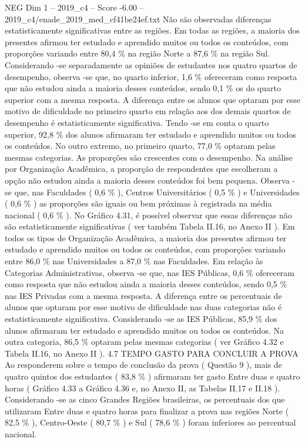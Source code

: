 \begin{textsample}{NEG Dim 1 – 2019\_c4 – Score -6.00 – 2019\_c4/enade\_2019\_med\_cf41be24ef.txt}
Não são observadas diferenças estatisticamente significativas entre as regiões.
Em todas as regiões, a maioria dos presentes afirmou ter estudado e aprendido muitos ou todos os conteúdos, com proporções variando entre 80,4 \% na região Norte a 87,6 \% na região Sul.
Considerando -se separadamente as opiniões de estudantes nos quatro quartos de desempenho, observa -se que, no quarto inferior, 1,6 \% ofereceram como resposta que não estudou ainda a maioria desses conteúdos, sendo 0,1 \% os do quarto superior com a mesma resposta.
A diferença entre os alunos que optaram por esse motivo de dificuldade no primeiro quarto em relação aos dos demais quartos de desempenho é estatisticamente significativa.
Tendo -se em conta o quarto superior, 92,8 \% dos alunos afirmaram ter estudado e aprendido muitos ou todos os conteúdos.
No outro extremo, no primeiro quarto, 77,0 \% optaram pelas mesmas categorias.
As proporções são crescentes com o desempenho.
Na análise por Organização Acadêmica, a proporção de respondentes que escolheram a opção não estudou ainda a maioria desses conteúdos foi bem pequena.
Observa -se que, nas Faculdades ( 0,6 \% ), Centros Universitários ( 0,5 \% ) e Universidades ( 0,6 \% ) as proporções são iguais ou bem próximas à registrada na média nacional ( 0,6 \% ).
No Gráfico 4.31, é possível observar que essas diferenças não são estatisticamente significativas ( ver também Tabela II.16, no Anexo II ).
Em todos os tipos de Organização Acadêmica, a maioria dos presentes afirmou ter estudado e aprendido muitos ou todos os conteúdos, com proporções variando entre 86,0 \% nas Universidades a 87,0 \% nas Faculdades.
Em relação às Categorias Administrativas, observa -se que, nas IES Públicas, 0,6 \% ofereceram como resposta que não estudou ainda a maioria desses conteúdos, sendo 0,5 \% nas IES Privadas com a mesma resposta.
A diferença entre os percentuais de alunos que optaram por esse motivo de dificuldade nas duas categorias não é estatisticamente significativa.
Considerando -se as IES Públicas, 85,9 \% dos alunos afirmaram ter estudado e aprendido muitos ou todos os conteúdos.
Na outra categoria, 86,5 \% optaram pelas mesmas categorias ( ver Gráfico 4.32 e Tabela II.16, no Anexo II ). 4.7 TEMPO GASTO PARA CONCLUIR A PROVA Ao responderem sobre o tempo de conclusão da prova ( Questão 9 ), mais de quatro quintos dos estudantes ( 83,8 \% ) afirmaram ter gasto Entre duas e quatro horas ( Gráfico 4.33 a Gráfico 4.36 e, no Anexo II, as Tabelas II.17 e II.18 ).
Considerando -se as cinco Grandes Regiões brasileiras, os percentuais dos que utilizaram Entre duas e quatro horas para finalizar a prova nas regiões Norte ( 82,5 \% ), Centro-Oeste ( 80,7 \% ) e Sul ( 78,6 \% ) foram inferiores ao percentual nacional.

\end{textsample}
